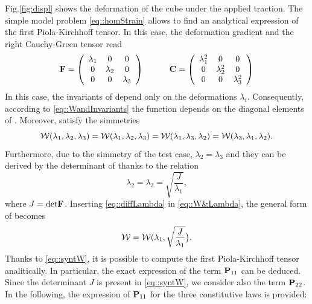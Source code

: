 Fig.\ref{fig:displ} shows the deformation of the cube under the
applied traction. The simple model problem \eqref{eq::homStrain}
allows to find an analytical expression of the first Piola-Kirchhoff
tensor. In this case, the deformation gradient \F{} and the right
Cauchy-Green tensor \C{} read
\begin{equation} \textbf{F} = \left(
    \begin{array}{ccc} \lambda_1 & 0 & 0 \\ 0 & \lambda_2 & 0 \\ 0 & 0 &
      \lambda_3
    \end{array}\right)\qquad\quad \textbf{C} = \left(
    \begin{array}{ccc} \lambda_1^2 & 0 & 0 \\ 0 & \lambda_2^2 & 0 \\ 0 &
      0 & \lambda_3^2
    \end{array}\right)
\end{equation}
In this case, the invariants of \C{} depend only on the
deformations $\lambda_i$. Consequently, according to
\eqref{eq::WandInvariants} the function \W{} depends on the diagonal
elements of \F{}. Moreover, \W{} satisfy the simmetries
\begin{equation}
  \mathcal{W}(\lambda_1,\lambda_2,\lambda_3)=\mathcal{W}(\lambda_1,\lambda_2,\lambda_3) =
  \mathcal{W}(\lambda_1,\lambda_3,\lambda_2)=\mathcal{W}(\lambda_3,\lambda_1,\lambda_2).
  \label{eq::W&Lambda}
\end{equation}
Furthermore, due to the simmetry of the test case,
$\lambda_2=\lambda_3$ and they can be derived by the determinant of \F{}
thanks to the relation
\begin{equation} \displaystyle
  \lambda_2=\lambda_3=\sqrt{\frac{J}{\lambda_1}},
  \label{eq::diffLambda}
\end{equation}
where $J=\text{det}\textbf{F}$. Inserting
\eqref{eq::diffLambda} in \eqref{eq::W&Lambda}, the general form of \W{}
becomes
\begin{equation} \displaystyle
  \mathcal{W}=\mathcal{W}(\lambda_1,\sqrt{\frac{J}{\lambda_1}}\big).
  \label{eq::syntW}
\end{equation}
Thanks to \eqref{eq::syntW}, it is possible to compute
the first Piola-Kirchhoff tensor analitically. In particular, the
exact expression of the term $\textbf{P}_{11}$ can be deduced. Since the
determinant $J$ is present in \eqref{eq::syntW}, we consider also the
term $\textbf{P}_{22}$. In the following, the expression of $\textbf{P}_{11}$
for the three constitutive laws is provided:
